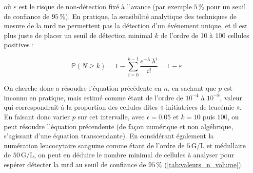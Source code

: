 où $\varepsilon$ est le risque de non-détection fixé à l'avance (par exemple $5\,\%$ pour un seuil de confiance de $95\,\%$).
En pratique, la sensibilité analytique des techniques de mesure de la \gls{mrd} ne permettent pas la détection d'un événement unique, et il est plus juste de placer 
un seuil de détection minimal $k$ de l'ordre de 10 à 100 cellules positives : 

\begin{equation}
    \mathbb{P}(N \geq k) = 1 - \sum_{i = 0}^{k-1} \frac{e^{-\lambda} \, \lambda^{i}}{i!} = 1 - \varepsilon
\end{equation}

On cherche donc a résoudre l'équation précédente en $n$, en sachant que $p$ est inconnu en pratique, mais estimé comme étant de l'ordre de $10^{-4}$ à $10^{-8}$, 
valeur qui correspondrait à la proportion des cellules dites « initiatrices de leucémie ». En faisant donc varier $p$ sur cet intervalle, avec $\epsilon = 0.05$ et 
$k = 10$ puis $100$, on peut résoudre l'équation précendente (de façon numérique et non algébrique, s'agissant d'une équation transcendante). En considérant également 
la numération leucocytaire sanguine comme étant de l'ordre de $5\,\text{G/L}$ et médullaire de $50\,\text{G/L}$, on peut en déduire le nombre minimal de cellules à analyser 
pour espérer détecter la \gls{mrd} au seuil de confiance de $95\,\%$ (\autoref{tab:valeurs_n_volume}).

